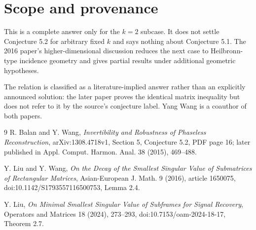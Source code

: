 \documentclass[11pt]{article}
\begin{document}
\section*{Scope and provenance}

This is a complete answer only for the $k=2$ subcase.  It does not settle
Conjecture 5.2 for arbitrary fixed $k$ and says nothing about Conjecture
5.1.  The 2016 paper's higher-dimensional discussion reduces the next
case to Heilbronn-type incidence geometry and gives partial results under
additional geometric hypotheses.

The relation is classified as a literature-implied answer rather than an
explicitly announced solution: the later paper proves the identical
matrix inequality but does not refer to it by the source's conjecture
label.  Yang Wang is a coauthor of both papers.

\begin{thebibliography}{9}
R. Balan and Y. Wang,
\emph{Invertibility and Robustness of Phaseless Reconstruction},
arXiv:1308.4718v1, Section 5, Conjecture 5.2, PDF page 16;
later published in Appl. Comput. Harmon. Anal. 38 (2015), 469--488.

Y. Liu and Y. Wang,
\emph{On the Decay of the Smallest Singular Value of Submatrices of Rectangular Matrices},
Asian-European J. Math. 9 (2016), article 1650075,
doi:10.1142/S1793557116500753, Lemma 2.4.

Y. Liu,
\emph{On Minimal Smallest Singular Value of Subframes for Signal Recovery},
Operators and Matrices 18 (2024), 273--293,
doi:10.7153/oam-2024-18-17, Theorem 2.7.
\end{thebibliography}
\end{document}
